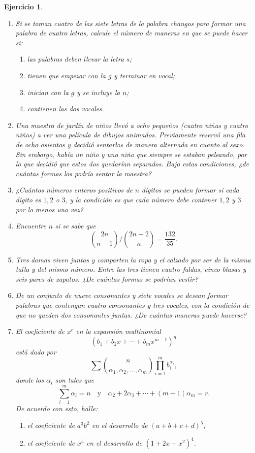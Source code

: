 \documentclass[12pt,twoside]{article}
\newtheorem{Ejer}{Ejercicio}
\begin{document}
\begin{Ejer}
\begin{enumerate}
\item Si se toman cuatro de las siete letras de la palabra \textit{changos} para formar una palabra de cuatro letras, calcule el número de maneras en que se puede hacer si:
\begin{enumerate}
\item las palabras deben llevar la letra $s$;
\item tienen que empezar con la $g$ y terminar en vocal;
\item inician con la $g$ y se incluye la $n$;
\item contienen las dos vocales.
\end{enumerate}

\item Una maestra de jardín de niños llevó a ocho pequeños (cuatro niñas y cuatro niños) a ver una película de dibujos animados. Previamente reservó una fila de ocho asientos y decidió sentarlos de manera alternada en cuanto al sexo. Sin embargo, había un niño y una niña que siempre se estaban peleando, por lo que decidió que estos dos quedarían separados. Bajo estas condiciones, ¿de cuántas formas los podría sentar la maestra?

\item ¿Cuántos números enteros positivos de $n$ dígitos se pueden formar si cada dígito es $1,2$ o $3$, y la condición es que cada número debe contener $1,2$ y $3$ por lo menos una vez?

\item Encuentre $n$ si se sabe que
\[
\binom{2n}{n-1}\Big/\binom{2n-2}{n}=\frac{132}{35}.
\]

\item Tres damas viven juntas y comparten la ropa y el calzado por ser de la misma talla y del mismo número. Entre las tres tienen cuatro faldas, cinco blusas y seis pares de zapatos. ¿De cuántas formas se podrían vestir?

\item De un conjunto de nueve consonantes y siete vocales se desean formar palabras que contengan cuatro consonantes y tres vocales, con la condición de que no queden dos consonantes juntas. ¿De cuántas maneras puede hacerse?

\item El coeficiente de $x^r$ en la expansión multinomial
\[
(b_1+b_2x+\cdots+b_mx^{m-1})^n
\]
está dado por
\[
\sum \binom{n}{\alpha_1,\alpha_2,\ldots,\alpha_m}\prod_{i=1}^m b_i^{\alpha_i},
\]
donde los $\alpha_i$ son tales que
\[
\sum_{i=1}^m \alpha_i=n
\quad\text{y}\quad
\alpha_2+2\alpha_3+\cdots+(m-1)\alpha_m=r.
\]
De acuerdo con esto, halle:
\begin{enumerate}
\item el coeficiente de $a^3b^2$ en el desarrollo de $(a+b+c+d)^5$;
\item el coeficiente de $x^5$ en el desarrollo de $(1+2x+x^2)^4$.
\end{enumerate}


\end{enumerate}
\end{Ejer}
\end{document}
